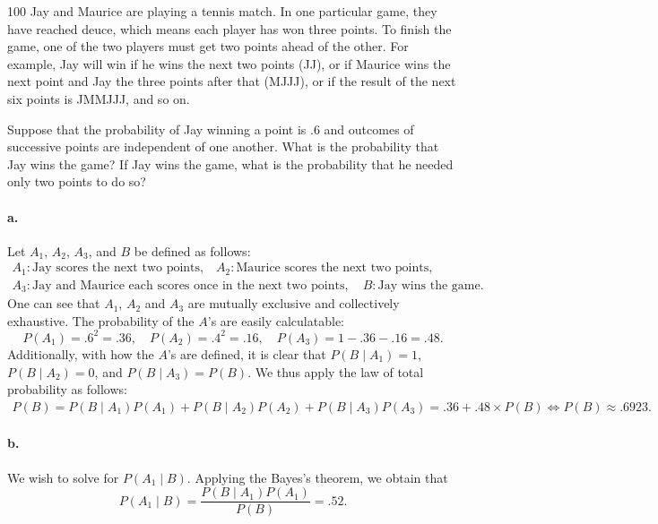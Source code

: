 \documentclass{exam}
\begin{document}
\begin{problem}{100}
	Jay and Maurice are playing a tennis match. In one particular game, they have reached deuce, which means each player has won three points. To finish the game, one of the two players must get two points ahead of the other. For example, Jay will win if he wins the next two points (JJ), or if Maurice wins the next point and Jay the three points after that (MJJJ), or if the result of the next six points is JMMJJJ, and so on.
	\begin{tasks}[label=\textbf{\alph*.}]
		\task Suppose that the probability of Jay winning a point is $.6$ and outcomes of successive points are independent of one another. What is the probability that Jay wins the game?
		\task If Jay wins the game, what is the probability that he needed only two points to do so?
	\end{tasks}
\end{problem}

\paragraph{a.} Let $A_1$, $A_2$, $A_3$, and $B$ be defined as follows:
\begin{gather*}
	A_1: \text{Jay scores the next two points,} \quad A_2: \text{Maurice scores the next two points,} \\
	A_3: \text{Jay and Maurice each scores once in the next two points}, \quad B: \text{Jay wins the game.}
\end{gather*}
One can see that $A_1$, $A_2$ and $A_3$ are mutually exclusive and collectively exhaustive. The probability of the $A$'s are easily calculatable:
\[
	P(A_1) = .6^2 = .36, \quad P(A_2) = .4^2 = .16, \quad P(A_3) = 1 - .36 - .16 = .48.
\]
Additionally, with how the $A$'s are defined, it is clear that $P(B \mid A_1) = 1$, $P(B \mid A_2) = 0$, and $P(B \mid A_3) = P(B)$. We thus apply the law of total probability as follows:
\begin{align*}
	P(B) = P(B \mid A_1)P(A_1) + P(B \mid A_2)P(A_2) + P(B \mid A_3)P(A_3) = .36 + .48 \times P(B) \iff P(B) \approx .6923.
\end{align*}

\paragraph{b.} We wish to solve for $P(A_1 \mid B)$. Applying the Bayes's theorem, we obtain that
\[
	P(A_1 \mid B) = \frac{P(B \mid A_1)P(A_1)}{P(B)} = .52.
\]
\end{document}

